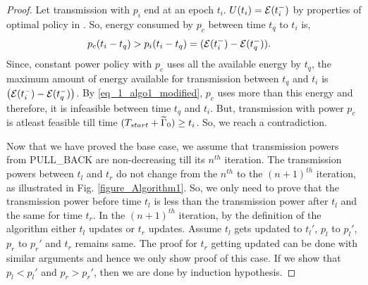 \begin{proof}
Let transmission with $p_i$ end at an epoch $t_i$. $U(t_i)=\mathcal{E}(t_i^-)$ by properties of optimal policy in \cite{Yang}. So, energy consumed by $p_c$ between time $t_q$ to $t_i$ is, 
\begin{align}
&p_c(t_i-t_q)>p_i(t_i-t_q)=(\ETx(t_i^-)-\ETx(t_q^-)).\label{eq_1_algo1_modified}
\end{align}
Since, constant power policy with $p_c$ uses all the available energy by $t_q$, the maximum amount of energy available for transmission between $t_q$ and $t_i$ is $\left(\mathcal{E}(t_i^-)-\mathcal{E}(t_q^-)\right)$. By \eqref{eq_1_algo1_modified}, $p_c$ uses more than this energy and therefore, it is infeasible between time $t_q$ and $t_i$. But, transmission with power $p_c$ is atleast feasible till time $(T_{start}+\widetilde{\Gamma}_0)\ge t_i$. So, we reach a contradiction.        
%

Now that we have proved the base case, we assume that transmission powers from PULL\_BACK are non-decreasing till its $n^{th}$ iteration. The transmission powers between $t_l$ and $t_r$ do not change from the $n^{th}$ to the $(n+1)^{th}$ iteration, as illustrated in Fig. \ref{figure_Algorithm1}. So, we only need to prove that the transmission power before time $t_l$ is less than the transmission power after $t_l$ and the same for time $t_r$. In the $(n+1)^{th}$ iteration, by the definition of the algorithm either $t_l$ updates or $t_{r}$ updates. Assume $t_l$ gets updated to $t_{l}'$, $p_l$ to $p_l'$, $p_r$ to $p_r'$ and $t_r$ remains same. The proof for $t_r$ getting updated can be done with similar arguments and hence we only show proof of this case. If we show that $p_l<p_l'$ and $p_r>p_r'$, then we are done by induction hypothesis.


\end{proof}
